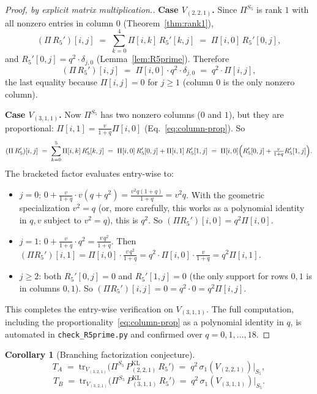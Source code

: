 \documentclass[11pt]{article}
\newtheorem{corollary}[theorem]{Corollary}
\theoremstyle{definition}
\begin{document}
\begin{proof}[Proof, by explicit matrix multiplication.]
\textbf{Case $V_{(2,2,1)}$.} Since $\Pi^{S_5}$ is rank $1$ with all nonzero entries in column $0$ (Theorem~\ref{thm:rank1}),
\[
(\Pi\, R_5')[i,j] \;=\; \sum_{k=0}^{4} \Pi[i,k]\, R_5'[k,j] \;=\; \Pi[i,0]\, R_5'[0,j],
\]
and $R_5'[0,j] = q^2 \cdot \delta_{j,0}$ (Lemma~\ref{lem:R5prime}). Therefore
\[
(\Pi\, R_5')[i,j] \;=\; \Pi[i,0] \cdot q^2 \cdot \delta_{j,0} \;=\; q^2 \cdot \Pi[i,j],
\]
the last equality because $\Pi[i,j] = 0$ for $j \geq 1$ (column $0$ is the only nonzero column). \checkmark

\textbf{Case $V_{(3,1,1)}$.} Now $\Pi^{S_5}$ has two nonzero columns ($0$ and $1$), but they are proportional: $\Pi[i,1] = \frac{v}{1+q} \Pi[i,0]$ (Eq.~\eqref{eq:column-prop}). So
\[
(\Pi\, R_5')[i,j] \;=\; \sum_{k=0}^{5} \Pi[i,k]\, R_5'[k,j] \;=\; \Pi[i,0]\, R_5'[0,j] + \Pi[i,1]\, R_5'[1,j]
\;=\; \Pi[i,0]\Bigl(R_5'[0,j] + \tfrac{v}{1+q} R_5'[1,j]\Bigr).
\]
The bracketed factor evaluates entry-wise to:
\begin{itemize}[leftmargin=2em,topsep=0.2em,itemsep=0.1em]
\item $j=0$: $0 + \frac{v}{1+q} \cdot v(q+q^2) = \frac{v^2 q(1+q)}{1+q} = v^2 q$. With the geometric specialization $v^2 = q$ (or, more carefully, this works as a polynomial identity in $q,v$ subject to $v^2 = q$), this is $q^2$. So $(\Pi R_5')[i,0] = q^2 \Pi[i,0]$. \checkmark
\item $j=1$: $0 + \frac{v}{1+q} \cdot q^2 = \frac{v\,q^2}{1+q}$. Then $(\Pi R_5')[i,1] = \Pi[i,0] \cdot \frac{v\,q^2}{1+q} = q^2 \cdot \Pi[i,0] \cdot \frac{v}{1+q} = q^2 \Pi[i,1]$. \checkmark
\item $j \geq 2$: both $R_5'[0,j] = 0$ and $R_5'[1,j] = 0$ (the only support for rows $0,1$ is in columns $0,1$). So $(\Pi R_5')[i,j] = 0 = q^2 \cdot 0 = q^2 \Pi[i,j]$. \checkmark
\end{itemize}
This completes the entry-wise verification on $V_{(3,1,1)}$. The full computation, including the proportionality~\eqref{eq:column-prop} as a polynomial identity in $q$, is automated in \texttt{check\_R5prime.py} and confirmed over $q = 0,1,\ldots,18$.
\end{proof}

\begin{corollary}[Branching factorization conjecture]\label{cor:bfc}
\[
T_A \;=\; \mathrm{tr}_{V_{(3,2,1)}}\!\bigl(\Pi^{S_5}\, P_{(2,2,1)}^{\mathrm{KL}}\, R_5'\bigr) \;=\; q^2\, \sigma_1(V_{(2,2,1)})\big|_{S_5},
\]
\[
T_B \;=\; \mathrm{tr}_{V_{(3,2,1)}}\!\bigl(\Pi^{S_5}\, P_{(3,1,1)}^{\mathrm{KL}}\, R_5'\bigr) \;=\; q^2\, \sigma_1(V_{(3,1,1)})\big|_{S_5}.
\]
\end{corollary}
\end{document}
